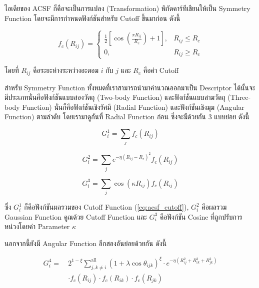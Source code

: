 ไอเดียของ ACSF ก็คือจะเป็นการแปลง (Transformation) พิกัดคาร์ทีเชียนให้เป็น Symmetry Function โดยจะมีการกำหนดฟังก์ชันสำหรับ 
Cutoff ขึ้นมาก่อน ดังนี้

\begin{equation}
    \label{eq:acsf_cutoff}
    f_{c}(R_{ij}) = 
    \begin{cases}
        \frac{1}{2}[\cos(\frac{\pi R_{ij}}{R_{c}}) + 1], & R_{ij} \le R_{c} \\
        0,                                             & R_{ij} \ge R_{c}
    \end{cases}
\end{equation}

\noindent โดยที่ $R_{ij}$ คือระยะห่างระหว่างอะตอม $i$ กับ $j$ และ $R_{c}$ คือค่า Cutoff

สำหรับ Symmetry Function ทั้งหมดที่เราสามารถนำมาคำนวณออกมาเป็น Descriptor ได้นั้นจะมีประเภทนั่นคือฟังก์ชันแบบสองวัตถุ
(Two-body Function) และฟังก์ชันแบบสามวัตถุ (Three-body Function) นั่นก็คือฟังก์ชันเชิงรัศมี (Radial Function) และฟังก์ชันเชิงมุม 
(Angular Function) ตามลำดับ โดยเรามาดูกันที่ Radial Function ก่อน ซึ่งจะมีด้วยกัน 3 แบบย่อย ดังนี้

\begin{equation}
    G^{1}_{i} = \sum_{j} f_{c}(R_{ij})
\end{equation}

\begin{equation}
    G^{2}_{i} = \sum_{j} e^{-\eta(R_{ij} - R_{s})^{2}} f_{c}(R_{ij})
\end{equation}

\begin{equation}
    G^{3}_{i} = \sum_{j} \cos(\kappa R_{ij}) f_{c}(R_{ij})
\end{equation}

\noindent ซึ่ง $G^{1}_{i}$ ก็คือฟังก์ชันผลรวมของ Cutoff Function (\ref{eq:acsf_cutoff}), $G^{2}_{i}$ คือผลรวม Gaussian Function
คูณด้วย Cutoff Function และ $G^{3}_{i}$ คือฟังก์ชัน Cosine ที่ถูกปรับการหน่วงโดยค่า Parameter $\kappa$ 

นอกจากนี้ยังมี Angular Function อีกสองอันย่อยด้วยกัน ดังนี้

\begin{align}
    G^{4}_{i} =~&2^{1 - \xi}\sum^{\text{all}}_{j,k \neq i} (1+\lambda \cos \theta_{ijk})^{\xi}
    \cdot e^{-\eta(R^{2}_{ij} + R^{2}_{ik} + R^{2}_{jk})} \nonumber \\
    & \cdot f_{c}(R_{ij}) \cdot f_{c}(R_{ik}) \cdot f_{c}(R_{jk})
\end{align}

